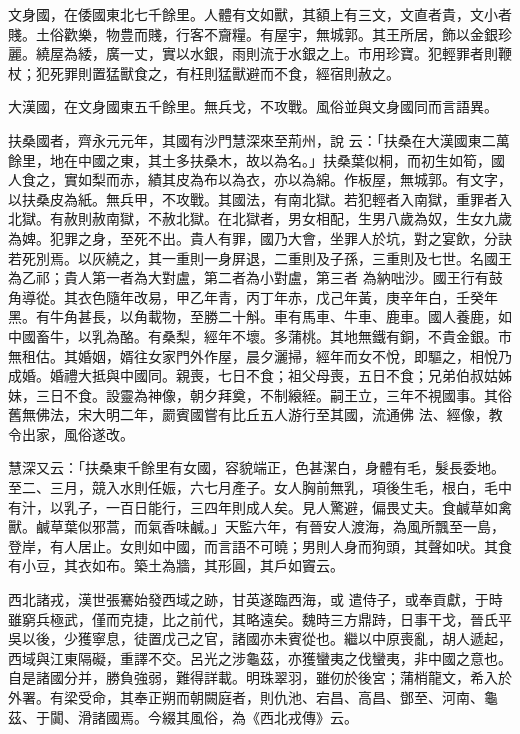\begin{pinyinscope}
 文身國，在倭國東北七千餘里。人體有文如獸，其額上有三文，文直者貴，文小者賤。土俗歡樂，物豊而賤，行客不齎糧。有屋宇，無城郭。其王所居，飾以金銀珍麗。繞屋為緌，廣一丈，實以水銀，雨則流于水銀之上。市用珍寶。犯輕罪者則鞭杖；犯死罪則置猛獸食之，有枉則猛獸避而不食，經宿則赦之。



 大漢國，在文身國東五千餘里。無兵戈，不攻戰。風俗並與文身國同而言語異。



 扶桑國者，齊永元元年，其國有沙門慧深來至荊州，說
 云：「扶桑在大漢國東二萬餘里，地在中國之東，其土多扶桑木，故以為名。」扶桑葉似桐，而初生如筍，國人食之，實如梨而赤，績其皮為布以為衣，亦以為綿。作板屋，無城郭。有文字，以扶桑皮為紙。無兵甲，不攻戰。其國法，有南北獄。若犯輕者入南獄，重罪者入北獄。有赦則赦南獄，不赦北獄。在北獄者，男女相配，生男八歲為奴，生女九歲為婢。犯罪之身，至死不出。貴人有罪，國乃大會，坐罪人於坑，對之宴飲，分訣若死別焉。以灰繞之，其一重則一身屏退，二重則及子孫，三重則及七世。名國王為乙祁；貴人第一者為大對盧，第二者為小對盧，第三者
 為納咄沙。國王行有鼓角導從。其衣色隨年改易，甲乙年青，丙丁年赤，戊己年黃，庚辛年白，壬癸年黑。有牛角甚長，以角載物，至勝二十斛。車有馬車、牛車、鹿車。國人養鹿，如中國畜牛，以乳為酪。有桑梨，經年不壞。多蒲桃。其地無鐵有銅，不貴金銀。市無租估。其婚姻，婿往女家門外作屋，晨夕灑掃，經年而女不悅，即驅之，相悅乃成婚。婚禮大抵與中國同。親喪，七日不食；祖父母喪，五日不食；兄弟伯叔姑姊妹，三日不食。設靈為神像，朝夕拜奠，不制縗絰。嗣王立，三年不視國事。其俗舊無佛法，宋大明二年，罽賓國嘗有比丘五人游行至其國，流通佛
 法、經像，教令出家，風俗遂改。



 慧深又云：「扶桑東千餘里有女國，容貌端正，色甚潔白，身體有毛，髮長委地。至二、三月，競入水則任娠，六七月產子。女人胸前無乳，項後生毛，根白，毛中有汁，以乳子，一百日能行，三四年則成人矣。見人驚避，偏畏丈夫。食鹹草如禽獸。鹹草葉似邪蒿，而氣香味鹹。」天監六年，有晉安人渡海，為風所飄至一島，登岸，有人居止。女則如中國，而言語不可曉；男則人身而狗頭，其聲如吠。其食有小豆，其衣如布。築土為牆，其形圓，其戶如竇云。



 西北諸戎，漢世張騫始發西域之跡，甘英遂臨西海，或
 遣侍子，或奉貢獻，于時雖窮兵極武，僅而克捷，比之前代，其略遠矣。魏時三方鼎跱，日事干戈，晉氏平吳以後，少獲寧息，徒置戊己之官，諸國亦未賓從也。繼以中原喪亂，胡人遞起，西域與江東隔礙，重譯不交。呂光之涉龜茲，亦獲蠻夷之伐蠻夷，非中國之意也。自是諸國分并，勝負強弱，難得詳載。明珠翠羽，雖仞於後宮；蒲梢龍文，希入於外署。有梁受命，其奉正朔而朝闕庭者，則仇池、宕昌、高昌、鄧至、河南、龜茲、于闐、滑諸國焉。今綴其風俗，為《西北戎傳》云。




\end{pinyinscope}

